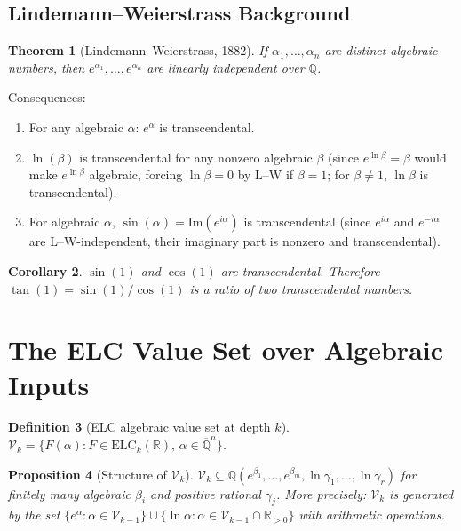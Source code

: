 \documentclass[11pt]{article}
\newtheorem{theorem}{Theorem}
\newtheorem{proposition}[theorem]{Proposition}
\newtheorem{definition}[theorem]{Definition}
\newtheorem{corollary}[theorem]{Corollary}
\begin{document}
\subsection{Lindemann--Weierstrass Background}

\begin{theorem}[Lindemann--Weierstrass, 1882]
If $\alpha_1, \ldots, \alpha_n$ are distinct algebraic numbers, then
$e^{\alpha_1}, \ldots, e^{\alpha_n}$ are linearly independent over $\mathbb{Q}$.
\end{theorem}

\noindent Consequences:
\begin{enumerate}
  \item For any algebraic $\alpha$: $e^\alpha$ is transcendental.
  \item $\ln(\beta)$ is transcendental for any nonzero algebraic $\beta$
        (since $e^{\ln \beta} = \beta$ would make $e^{\ln \beta}$ algebraic,
        forcing $\ln \beta = 0$ by L--W if $\beta = 1$; for $\beta \neq 1$,
        $\ln \beta$ is transcendental).
  \item For algebraic $\alpha$, $\sin(\alpha) = \mathrm{Im}(e^{i\alpha})$ is transcendental
        (since $e^{i\alpha}$ and $e^{-i\alpha}$ are L--W-independent, their imaginary part
        is nonzero and transcendental).
\end{enumerate}

\begin{corollary}
$\sin(1)$ and $\cos(1)$ are transcendental. Therefore $\tan(1) = \sin(1)/\cos(1)$
is a ratio of two transcendental numbers.
\end{corollary}

\section{The ELC Value Set over Algebraic Inputs}
\label{sec:elcvalues}

\begin{definition}[ELC algebraic value set at depth $k$]
$\mathcal{V}_k = \{F(\alpha) : F \in \mathrm{ELC}_k(\mathbb{R}),\, \alpha \in \overline{\mathbb{Q}}^n\}$.
\end{definition}

\begin{proposition}[Structure of $\mathcal{V}_k$]
\label{prop:Vk}
$\mathcal{V}_k \subseteq \mathbb{Q}(e^{\beta_1}, \ldots, e^{\beta_m}, \ln \gamma_1, \ldots, \ln \gamma_r)$
for finitely many algebraic $\beta_i$ and positive rational $\gamma_j$.
More precisely: $\mathcal{V}_k$ is generated by the set
$\{e^\alpha : \alpha \in \mathcal{V}_{k-1}\} \cup \{\ln \alpha : \alpha \in \mathcal{V}_{k-1} \cap \mathbb{R}_{>0}\}$
with arithmetic operations.
\end{proposition}
\end{document}
